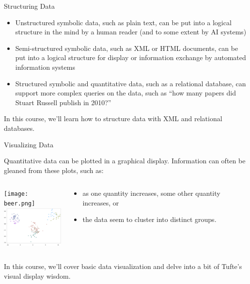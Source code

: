 \documentclass{beamer}
\begin{document}
\begin{frame}{Structuring Data}

\begin{itemize}
\item Unstructured symbolic data, such as plain text, can be put into
  a logical structure in the mind by a human reader (and to some
  extent by AI systems)
\item Semi-structured symbolic data, such as XML or HTML documents, can be
  put into a logical structure for display or information exchange by
  automated information systems
\item Structured symbolic and quantitative data, such as a relational
  database, can support more complex queries on the data, such as
  ``how many papers did Stuart Russell publish in 2010?''
\end{itemize}

In this course, we'll learn how to structure data with XML and
relational databases.

\end{frame}

\begin{frame}{Visualizing Data}

Quantitative data can be plotted in a graphical display.  Information
can often be gleaned from these plots, such as:
\begin{columns}[t]
\begin{column}{2in}
\begin{center}
\texttt{[image: beer.png]}\\
\vspace{.1in}
\includegraphics[width=1.3in]{clusters.png}
\end{center}
\end{column}
\begin{column}{2.5in}

\begin{itemize}
\item as one quantity increases, some other quantity increases, or
\vspace{.8in}
\item the data seem to cluster into distinct groups.
\end{itemize}
\end{column}
\end{columns}
\vspace{.1in}
In this course, we'll cover basic data visualization and delve into a
bit of Tufte's visual display wisdom.
\end{frame}
\end{document}
